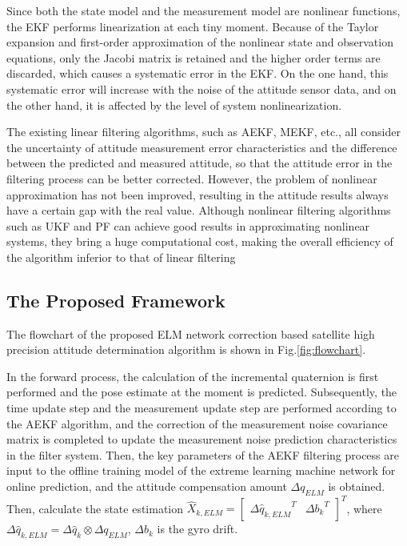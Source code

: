\documentclass{article}
\begin{document}
	Since both the state model and the measurement model are nonlinear functions, the EKF performs linearization at each tiny moment. Because of the Taylor expansion and first-order approximation of the nonlinear state and observation equations, only the Jacobi matrix is retained and the higher order terms are discarded, which causes a systematic error in the EKF. On the one hand, this systematic error will increase with the noise of the attitude sensor data, and on the other hand, it is affected by the level of system nonlinearization.
	
	The existing linear filtering algorithms, such as AEKF\cite{nayak2016comparative}, MEKF\cite{sola2017quaternion}, etc., all consider the uncertainty of attitude measurement error characteristics and the difference between the predicted and measured attitude, so that the attitude error in the filtering process can be better corrected. However, the problem of nonlinear approximation has not been improved, resulting in the attitude results always have a certain gap with the real value. Although nonlinear filtering algorithms such as UKF and PF can achieve good results in approximating nonlinear systems, they bring a huge computational cost, making the overall efficiency of the algorithm inferior to that of linear filtering
	
	\subsection{The Proposed Framework}
	\label{sec:2.2.1}
	The flowchart of the proposed ELM network correction based satellite high precision attitude determination algorithm is shown in Fig.\ref{fig:flowchart}.
	
	In the forward process, the calculation of the incremental quaternion is first performed and the pose estimate at the moment is predicted. Subsequently, the time update step and the measurement update step are performed according to the AEKF algorithm, and the correction of the measurement noise covariance matrix is completed to update the measurement noise prediction characteristics in the filter system. Then, the key parameters of the AEKF filtering process are input to the offline training model of the extreme learning machine network for online prediction, and the attitude compensation amount $\Delta {q_{ELM}}$ is obtained. Then, calculate the state estimation $ {\hat X_{k,ELM}} = {\left[{\begin{array}{*{20}{c}} {\Delta {{\hat q}_{k,ELM}}^T}&{\Delta {b_k}^T} \end{array}} \right]^T} $, where $ \Delta {\hat q_{k,ELM}} = \Delta {\hat q_k} \otimes \Delta {q_{ELM}} $, $ \Delta {b_k} $ is the gyro drift.
	
\end{document}
